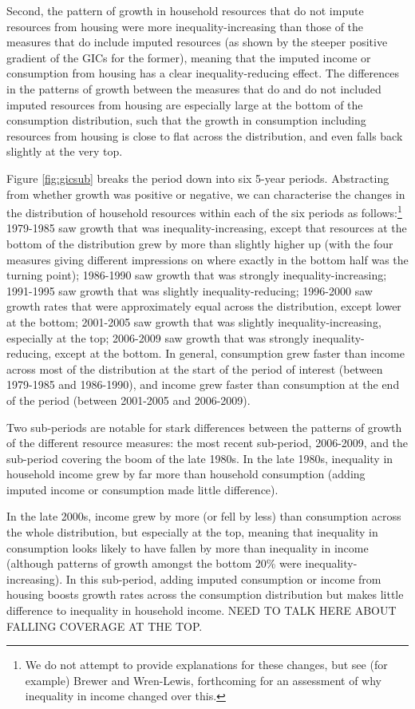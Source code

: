 Second, the pattern of growth in household resources that do not impute resources from housing were more inequality-increasing than those of the measures that do include imputed resources (as shown by the steeper positive gradient of the GICs for the former), meaning that the imputed income or consumption from housing has a clear inequality-reducing effect. The differences in the patterns of growth between the measures that do and do not included imputed resources from housing are especially large at the bottom of the consumption distribution, such that the growth in consumption including resources from housing is close to flat across the distribution, and even falls back slightly at the very top.

Figure \ref{fig:gicsub} breaks the period down into six 5-year periods. Abstracting from whether growth was positive or negative, we can characterise the changes in the distribution of household resources within each of the six periods as follows:\footnote{We do not attempt to provide explanations for these changes, but see (for example) Brewer and Wren-Lewis, forthcoming for an assessment of why inequality in income changed over this.} 1979-1985 saw growth that was inequality-increasing, except that resources at the bottom of the distribution grew by more than slightly higher up (with the four measures giving different impressions on where exactly in the bottom half was the turning point); 1986-1990 saw growth that was strongly inequality-increasing; 1991-1995 saw growth that was slightly inequality-reducing; 1996-2000 saw growth rates that were approximately equal across the distribution, except lower at the bottom; 2001-2005 saw growth that was slightly inequality-increasing, especially at the top; 2006-2009 saw growth that was strongly inequality-reducing, except at the bottom. In general, consumption grew faster than income across most of the distribution at the start of the period of interest (between 1979-1985 and 1986-1990), and income grew faster than consumption at the end of the period (between 2001-2005 and 2006-2009).

Two sub-periods are notable for stark differences between the patterns of growth of the different resource measures: the most recent sub-period, 2006-2009, and the sub-period covering the boom of the late 1980s.  In the late 1980s, inequality in household income grew by far more than household consumption (adding imputed income or consumption made little difference).

In the late 2000s, income grew by more (or fell by less) than consumption across the whole distribution, but especially at the top, meaning that inequality in consumption looks likely to have fallen by more than inequality in income (although patterns of growth amongst the bottom 20\% were inequality-increasing). In this sub-period, adding imputed consumption or income from housing boosts growth rates across the consumption distribution but makes little difference to inequality in household income. NEED TO TALK HERE ABOUT FALLING COVERAGE AT THE TOP.

